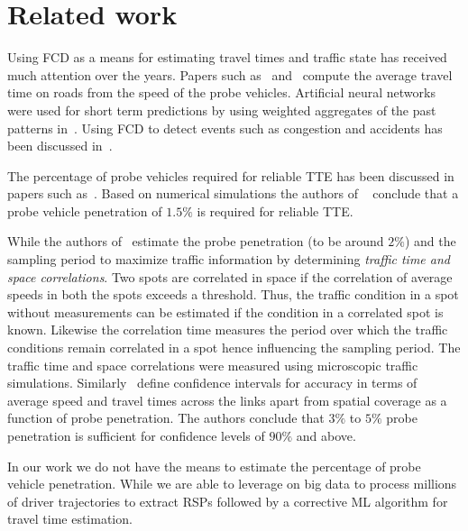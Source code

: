 \section{Related work}
\label{sec:related-work}
 Using \ac{FCD} as a means for estimating travel times and traffic state has received much attention over the years. Papers such as~\cite{de2008traffic} and~\cite{nanthawichit2003application} compute the average travel time on roads from the speed of the probe vehicles. Artificial neural networks were used for short term predictions by using weighted aggregates of the past patterns in~\cite{de2008traffic}.  Using \ac{FCD} to detect events such as congestion and accidents has been discussed in~\cite{asakura2015incident}.  
 
 The percentage of probe vehicles required for reliable \ac{TTE} has been discussed in papers such as~\cite{dai2003simulation,hong2007spatial,kerner2005traffic}. Based on numerical simulations the authors of ~\cite{kerner2005traffic} conclude that a probe vehicle penetration of $1.5\%$ is required for reliable \ac{TTE}. 
 
 While the authors of~\cite{hong2007spatial} estimate the  probe penetration (to be around $2\%$) and the sampling period to maximize traffic information by determining {\it traffic time and space correlations}. Two spots are correlated in space if the correlation of average speeds in both the spots exceeds a threshold. Thus, the traffic condition in a spot without measurements can be estimated if the condition in a correlated spot is known. Likewise the correlation time measures the period over which the traffic conditions remain correlated in a spot hence influencing the sampling period. The traffic time and space correlations were measured using microscopic traffic simulations. Similarly~\cite{dai2003simulation} define confidence intervals for accuracy in terms of average speed and travel times across the links apart from spatial coverage as a function of probe penetration. The authors conclude that $3\%$ to $5\%$ probe penetration is sufficient for confidence levels of $90\%$ and above.
 
 In our work we do not have the means to estimate the percentage of probe vehicle penetration. While we are able to leverage on big data to process millions of driver trajectories to extract \ac{RSP}s followed by a corrective \ac{ML} algorithm for travel time estimation. 